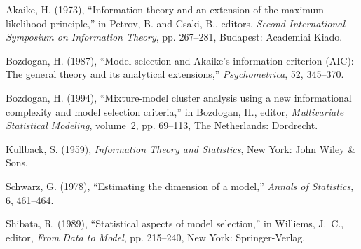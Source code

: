 \begin{thebibliography}{}

{Akaike, H.} (1973),
 ``Information theory and an extension of the maximum likelihood
  principle,''
 in {Petrov, B. and Csaki, B.}, editors, {\it Second International
  Symposium on Information Theory}, pp. 267--281, Budapest: Academiai
 Kiado. 

{Bozdogan, H.} (1987),
 ``Model selection and {A}kaike's information criterion ({AIC}): The
  general theory and its analytical extensions,''
 {\it Psychometrica}, 52, 345--370.


 {Bozdogan, H.} (1994),
 ``Mixture-model cluster analysis using a new informational complexity
  and model selection criteria,''
 in {Bozdogan, H.}, editor, {\it Multivariate Statistical Modeling},
  volume~2, pp. 69--113, The Netherlands: Dordrecht.

{Kullback, S.} (1959),
 {\it Information Theory and Statistics},
 New York: John Wiley \& Sons.


{Schwarz, G.} (1978),
 ``Estimating the dimension of a model,''
 {\it Annals of Statistics}, 6, 461--464.



{Shibata, R.} (1989),
 ``Statistical aspects of model selection,''
 in {Williems, J.~C.}, editor, {\it From Data to Model}, pp.
  215--240, New York: Springer-Verlag.


\end{thebibliography}
